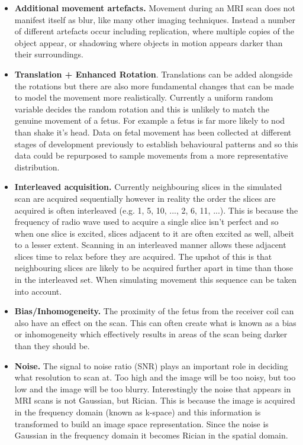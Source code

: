 \begin{itemize}
  \item \textbf{Additional movement artefacts.} Movement during an MRI scan does not manifest itself as blur, like many other imaging techniques. Instead a number of different artefacts occur including replication, where multiple copies of the object appear, or shadowing where objects in motion appears darker than their surroundings.

  \item \textbf{Translation + Enhanced Rotation}. Translations can be added alongside the rotations but there are also more fundamental changes that can be made to model the movement more realistically. Currently a uniform random variable decides the random rotation and this is unlikely to match the genuine movement of a fetus. For example a fetus is far more likely to nod than shake it's head. Data on fetal movement has been collected at different stages of development previously to establish behavioural patterns\cite{fetalmovement} and so this data could be repurposed to sample movements from a more representative distribution.

  \item \textbf{Interleaved acquisition.} Currently neighbouring slices in the simulated scan are acquired sequentially however in reality the order the slices are acquired is often interleaved (e.g. 1, 5, 10, ..., 2, 6, 11, ...). This is because the frequency of radio wave used to acquire a single slice isn't perfect and so when one slice is excited, slices adjacent to it are often excited as well, albeit to a lesser extent\cite{basicsofmri}. Scanning in an interleaved manner allows these adjacent slices time to relax before they are acquired. The upshot of this is that neighbouring slices are likely to be acquired further apart in time than those in the interleaved set. When simulating movement this sequence can be taken into account.

  \item \textbf{Bias/Inhomogeneity.} The proximity of the fetus from the receiver coil can also have an effect on the scan. This can often create what is known as a bias or inhomogeneity which effectively results in areas of the scan being darker than they should be.

  \item \textbf{Noise.} The signal to noise ratio (SNR) plays an important role in deciding what resolution to scan at. Too high and the image will be too noisy, but too low and the image will be too blurry. Interestingly the noise that appears in MRI scans is not Gaussian, but Rician. This is because the image is acquired in the frequency domain (known as k-space) and this information is transformed to build an image space representation. Since the noise is Gaussian in the frequency domain it becomes Rician in the spatial domain.
  

\end{itemize}
